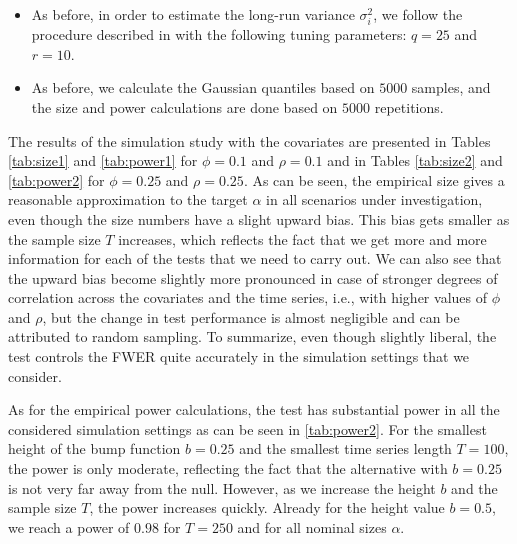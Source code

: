 \documentclass[a4paper,12pt]{article}
\begin{document}
\begin{enumerate}[label=\arabic*.,leftmargin=0.6cm]
{\begin{itemize}[topsep=0pt]
\begin{itemize}[label=--,leftmargin=0.45cm,itemsep=0pt]
\item As before, in order to estimate the long-run variance $\sigma_i^2$, we follow the procedure described in \citet{KhismatullinaVogt2020} with the following tuning parameters: $q = 25$ and $r = 10$.

\item As before, we calculate the Gaussian quantiles based on $5000$ samples, and the size and power calculations are done based on $5000$ repetitions.

\end{itemize}

The results of the simulation study with the covariates are presented in Tables \ref{tab:size1} and \ref{tab:power1} for $\phi = 0.1$ and $\rho = 0.1$ and in Tables \ref{tab:size2} and \ref{tab:power2} for $\phi = 0.25$ and $\rho = 0.25$. As can be seen, the empirical size gives a reasonable approximation to the target $\alpha$ in all scenarios under investigation, even though the size numbers have a slight upward bias. This bias gets smaller as the sample size $T$ increases, which reflects the fact that we get more and more information for each of the tests that we need to carry out. We can also see that the upward bias become slightly more pronounced in case of stronger degrees of correlation across the covariates and the time series, i.e., with higher values of $\phi$ and $\rho$, but the change in test performance is almost negligible and can be attributed to random sampling. To summarize, even though slightly liberal, the test controls the FWER quite accurately in the simulation settings that we consider.

As for the empirical power calculations, the test has substantial power in all the considered simulation settings as can be seen in \ref{tab:power2}. For the smallest height of the bump function $b = 0.25$ and the smallest time series length $T = 100$, the power is only moderate, reflecting the fact that the alternative with $b = 0.25$ is not very far away from the null. However, as we increase the height $b$ and the sample size $T$, the power increases quickly. Already for the height value $b = 0.5$, we reach a power of $0.98$ for $T = 250$ and for all nominal sizes $\alpha$.
 

\end{itemize}}
\end{enumerate}
\end{document}
